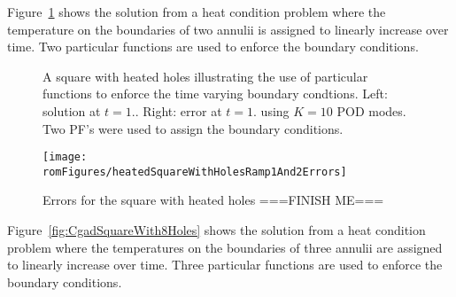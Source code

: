 Figure~\ref{fig:CgadSquareWithHoles} shows the solution from a heat condition problem where the temperature
on the boundaries of two annulii is assigned to linearly increase over time. Two particular functions are
used to enforce the boundary conditions.

\begin{figure}[hbt]
\newcommand{\figWidth}{5.5cm}
\newcommand{\trimfig}[2]{\trimPlot{#1}{#2}{0.1}{.0}{.11}{.02}}
\begin{center}
\end{center}
  \caption{A square with heated holes illustrating the use of particular functions to enforce the time varying boundary condtions.
   Left: solution at $t=1.$. Right: error at $t=1.$ using $K=10$ POD modes. Two PF's were used to assign the boundary conditions.
   }
  \label{fig:CgadSquareWithHoles}
\end{figure}


\begin{figure}[hbt]

\texttt{[image: \\romFigures/heatedSquareWithHolesRamp1And2Errors]}

\caption{Errors for the square with heated holes ===FINISH ME===}

\end{figure}


\clearpage
Figure~\ref{fig:CgadSquareWith8Holes} shows the solution from a heat condition problem where the temperatures
on the boundaries of three annulii are assigned to linearly increase over time. Three particular functions are
used to enforce the boundary conditions.

